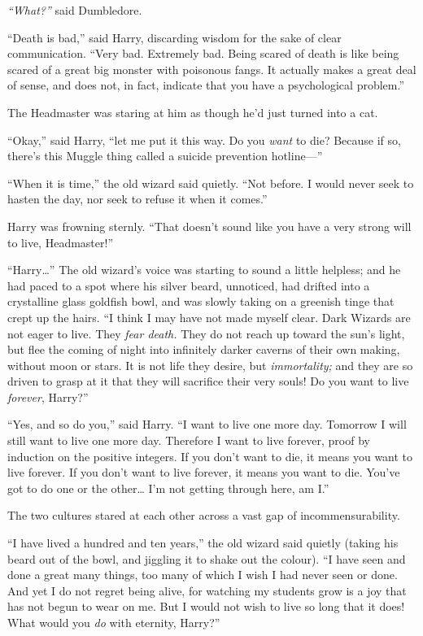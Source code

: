\emph{``What?''} said Dumbledore.

``Death is bad,'' said Harry, discarding wisdom for the sake of clear
communication. ``Very bad. Extremely bad. Being scared of death is like
being scared of a great big monster with poisonous fangs. It actually
makes a great deal of sense, and does not, in fact, indicate that you
have a psychological problem.''

The Headmaster was staring at him as though he'd just turned into a cat.

``Okay,'' said Harry, ``let me put it this way. Do you \emph{want} to
die? Because if so, there's this Muggle thing called a suicide
prevention hotline---''

``When it is time,'' the old wizard said quietly. ``Not before. I would
never seek to hasten the day, nor seek to refuse it when it comes.''

Harry was frowning sternly. ``That doesn't sound like you have a very
strong will to live, Headmaster!''

``Harry\ldots{}'' The old wizard's voice was starting to sound a little
helpless; and he had paced to a spot where his silver beard, unnoticed,
had drifted into a crystalline glass goldfish bowl, and was slowly
taking on a greenish tinge that crept up the hairs. ``I think I may have
not made myself clear. Dark Wizards are not eager to live. They
\emph{fear death.} They do not reach up toward the sun's light, but flee
the coming of night into infinitely darker caverns of their own making,
without moon or stars. It is not life they desire, but
\emph{immortality;} and they are so driven to grasp at it that they will
sacrifice their very souls! Do you want to live \emph{forever}, Harry?''

``Yes, and so do you,'' said Harry. ``I want to live one more day.
Tomorrow I will still want to live one more day. Therefore I want to
live forever, proof by induction on the positive integers. If you don't
want to die, it means you want to live forever. If you don't want to
live forever, it means you want to die. You've got to do one or the
other\ldots{} I'm not getting through here, am I.''

The two cultures stared at each other across a vast gap of
incommensurability.

``I have lived a hundred and ten years,'' the old wizard said quietly
(taking his beard out of the bowl, and jiggling it to shake out the
colour). ``I have seen and done a great many things, too many of which I
wish I had never seen or done. And yet I do not regret being alive, for
watching my students grow is a joy that has not begun to wear on me. But
I would not wish to live so long that it does! What would you \emph{do}
with eternity, Harry?''


